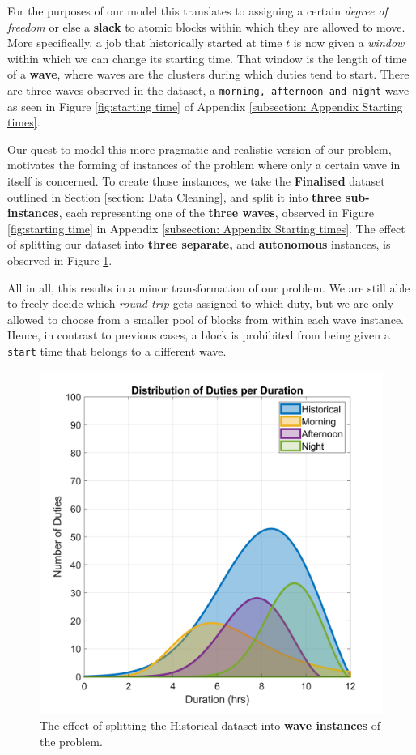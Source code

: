 \vspace{\baselineskip}
\noindent
For the purposes of our model this translates to assigning a certain \textit{degree of freedom} or else a \textbf{slack} to atomic blocks within which they are allowed to move. More specifically, a job that historically started at time $t$ is now given a \textit{window} within which we can change its starting time. That window is the length of time of a \textbf{wave}, where waves are the clusters during which duties tend to start. There are three waves observed in the dataset, a \texttt{morning, afternoon and night} wave as seen in Figure \ref{fig:starting time} of Appendix \ref{subsection: Appendix Starting times}.

\vspace{\baselineskip}
\noindent
Our quest to model this more pragmatic and realistic version of our problem, motivates the forming of instances of the problem where only a certain wave in itself is concerned. To create those instances, we take the \textbf{Finalised} dataset outlined in Section \ref{section: Data Cleaning}, and split it into \textbf{three sub-instances}, each representing one of the \textbf{three waves}, observed in Figure \ref{fig:starting time} in Appendix \ref{subsection: Appendix Starting times}. The effect of splitting our dataset into \textbf{three separate,} and \textbf{autonomous} instances, is observed in Figure \ref{fig: Wave-instances.}.

\vspace{\baselineskip}
\noindent
All in all, this results in a minor transformation of our problem. We are still able to freely decide which \textit{round-trip} gets assigned to which duty, but we are only allowed to choose from a smaller pool of blocks from within each wave instance. Hence, in contrast to previous cases, a block is prohibited from being given a \texttt{start} time that belongs to a different wave.  


\begin{figure}
\begin{center}
\includegraphics[width=0.46\linewidth]{[1] - chapter/Image Files/Waves-instances.png}
    
\end{center}
   \caption{The effect of splitting the Historical dataset into \textbf{wave instances} of the problem.}
\label{fig: Wave-instances.}
\end{figure}
\vspace*{4in}
